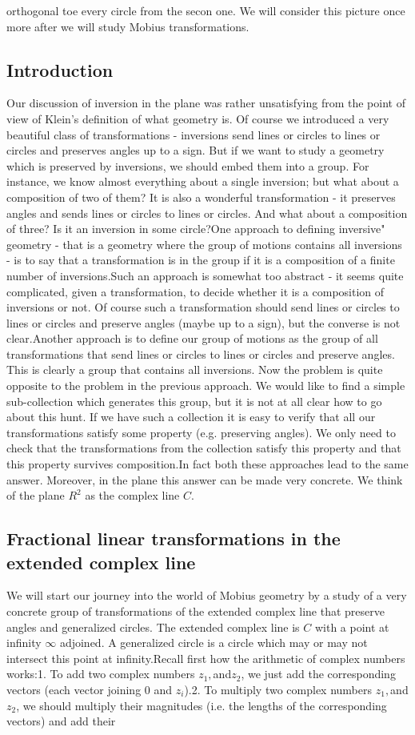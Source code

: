 orthogonal toe every circle from the secon one. We will consider this picture once more after we will study Mobius transformations.\subsection{Introduction}Our discussion of inversion in the plane was rather unsatisfying from the point of view of Klein's definition of what geometry is. Of course we introduced a very beautiful class of transformations - inversions send lines or circles to lines or circles and preserves angles up to a sign. But if we want to study a geometry which is preserved by inversions, we should embed them into a group. For instance, we know almost everything about a single inversion; but what about a composition of two of them? It is also a wonderful transformation - it preserves angles and sends lines or circles to lines or circles. And what about a composition of three? Is it an inversion in some circle?One approach to defining inversive" geometry - that is a geometry where the group of motions contains all inversions - is to say that a transformation is in the group if it is a composition of a finite number of inversions.Such an approach is somewhat too abstract - it seems quite complicated, given a transformation, to decide whether it is a composition of inversions or not. Of course such a transformation should send lines or circles to lines or circles and preserve angles (maybe up to a sign), but the converse is not clear.Another approach is to define our group of motions as the group of all transformations that send lines or circles to lines or circles and preserve angles. This is clearly a group that contains all inversions. Now the problem is quite opposite to the problem in the previous approach. We would like to find a simple sub-collection which generates this group, but it is not at all clear how to go about this hunt. If we have such a collection it is easy to verify that all our transformations satisfy some property (e.g. preserving angles). We only need to check that the transformations from the collection satisfy this property and that this property survives composition.In fact both these approaches lead to the same answer. Moreover, in the plane this answer can be made very concrete. We think of the plane $R^2$ as the complex line $C$.\subsection{Fractional linear transformations in the extended complex line}We will start our journey into the world of Mobius geometry by a study of a very concrete group of transformations of the extended complex line that preserve angles and generalized circles. The extended complex line is $C$ with a point at infinity $\infty$ adjoined. A generalized circle is a circle which may or may not intersect this point at infinity.Recall first how the arithmetic of complex numbers works:1. To add two complex numbers $z_1,$and$z_2$, we just add the corresponding vectors (each vector joining 0 and $z_i$).2. To multiply two complex numbers $z_1,$and$z_2$, we should multiply their magnitudes (i.e. the lengths of the corresponding vectors) and add their 